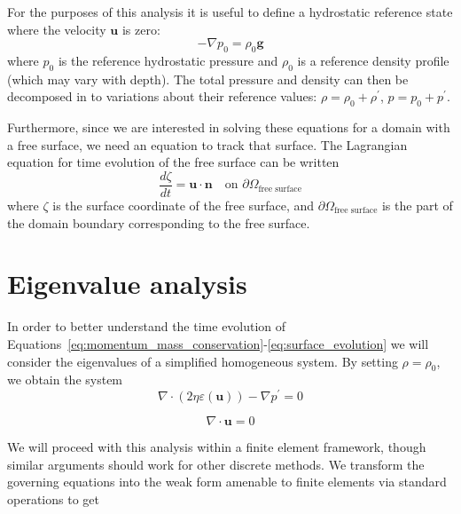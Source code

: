 \documentclass[preprint,12pt,authoryear]{elsarticle}
\begin{document}
For the purposes of this analysis it is useful to define a hydrostatic reference state where the 
velocity $\mathbf{u}$ is zero:
\begin{equation}
- \nabla p_0 = \rho_0 \mathbf{g}
\label{eq:hydrostatic_stokes}
\end{equation}
where $p_0$ is the reference hydrostatic pressure and $\rho_0$ is a reference density profile (which may vary with depth).
The total pressure and density can then be decomposed in to variations about their 
reference values: $\rho = \rho_0 + \rho^\prime$, $p = p_0 + p^\prime$. 

Furthermore, since we are interested in solving these equations for a domain with a free surface, 
we need an equation to track that surface.
The Lagrangian equation for time evolution of the free surface can be written
\begin{equation}
\frac{d \zeta}{dt} = \mathbf{u \cdot n} \quad \textrm{on  }  \partial \Omega_\textrm{free surface}
\label{eq:surface_evolution}
\end{equation}
where $\zeta$ is the surface coordinate of the free surface, and $\partial \Omega_\textrm{free surface}$ is the 
part of the domain boundary corresponding to the free surface.

\section{Eigenvalue analysis}
\label{sec:eigenvalue}

In order to better understand the time evolution of Equations~\eqref{eq:momentum_mass_conservation}-\eqref{eq:surface_evolution} 
we will consider the eigenvalues of a simplified homogeneous system. By setting $\rho = \rho_0$, we obtain the system
\begin{equation}
\nabla \cdot \left( 2 \eta \varepsilon( \mathbf{u} ) \right) - \nabla p^\prime = 0
\label{eq:homogeneous_stokes}
\end{equation}

\begin{equation}
\nabla \cdot \mathbf{u} = 0
\label{eq:incompressible}
\end{equation}

We will proceed with this analysis within a finite element framework, though similar arguments should 
work for other discrete methods.
We transform the governing equations into the weak form amenable to finite elements via standard operations \citep[e.g.][]{zienkiewicz1977finite} to get
\end{document}
